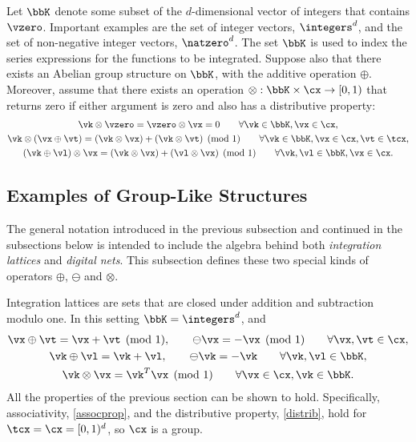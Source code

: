 \documentclass[]{elsarticle}
\begin{document}
Let $\bbK$ denote some subset of the $d$-dimensional vector of integers that contains $\vzero$.  Important examples are the set of integer vectors, $\integers^d$, and the set of non-negative integer vectors, $\natzero^d$.  The set $\bbK$ is used to index the series expressions for the functions to be integrated.  Suppose also that there exists an Abelian group structure on $\bbK$, with the additive operation $\oplus$.  Moreover, assume that there exists an operation $\otimes: \bbK \times \cx \to [0,1)$ that returns zero if either argument is zero and also has a distributive property:
\begin{subequations} \label{distrib}
\begin{gather}
\vk \otimes \vzero = \vzero \otimes \vx = 0 \qquad \forall \vk \in \bbK, \vx \in \cx,\\
\vk \otimes (\vx \oplus \vt) = (\vk\otimes\vx) + (\vk\otimes\vt) \pmod 1 \qquad \forall \vk \in \bbK, \vx \in \cx, \vt \in \tcx, \\
(\vk \oplus \vl) \otimes \vx = (\vk\otimes\vx) + (\vl\otimes\vx) \pmod 1 \qquad \forall \vk,\vl \in \bbK, \vx \in \cx.
\end{gather}
\end{subequations}

\subsection{Examples of Group-Like Structures}
The general notation introduced in the previous subsection and continued in the subsections below is intended to include the algebra behind both \emph{integration lattices} and \emph{digital nets}.  This subsection defines these two special kinds of operators $\oplus$, $\ominus$ and $\otimes$.

Integration lattices are sets that are closed under addition and subtraction modulo one.  In this setting $\bbK=\integers^d$, and
\begin{gather*}
\vx \oplus \vt = \vx + \vt \pmod 1, \qquad \ominus \vx = -\vx \pmod 1 \qquad \forall \vx, \vt \in \cx, \\
\vk \oplus \vl = \vk + \vl, \qquad \ominus \vk = -\vk \qquad \forall \vk, \vl \in \bbK, \\
\vk \otimes \vx = \vk^T \vx \pmod 1 \qquad \forall \vx \in \cx, \vk \in \bbK.
\end{gather*}
All the properties of the previous section can be shown to hold.  Specifically, associativity, \eqref{assocprop}, and the distributive property, \eqref{distrib}, hold for $\tcx = \cx=[0,1)^d$, so $\cx$ is a group.  
\end{document}
